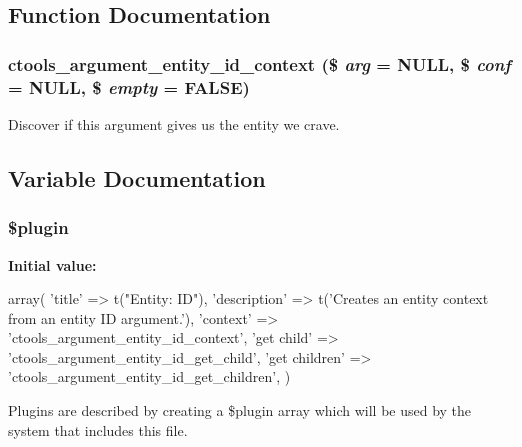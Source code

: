 \subsection{Function Documentation}
\hypertarget{entity__id_8inc_a760a7eddc5f2841801cc8fc1662c10ff}{
\subsubsection[{ctools\_\-argument\_\-entity\_\-id\_\-context}]{\setlength{\rightskip}{0pt plus 5cm}ctools\_\-argument\_\-entity\_\-id\_\-context (\$ {\em arg} = {\ttfamily NULL}, \/  \$ {\em conf} = {\ttfamily NULL}, \/  \$ {\em empty} = {\ttfamily FALSE})}}
\label{entity__id_8inc_a760a7eddc5f2841801cc8fc1662c10ff}
Discover if this argument gives us the entity we crave. 

\subsection{Variable Documentation}
\hypertarget{entity__id_8inc_ada8a7130088351710bb02ed622d6bf65}{
\subsubsection[{\$plugin}]{\setlength{\rightskip}{0pt plus 5cm}\$plugin}}
\label{entity__id_8inc_ada8a7130088351710bb02ed622d6bf65}
{\bfseries Initial value:}
\begin{DoxyCode}
 array(
  'title' => t("Entity: ID"),
  'description' => t('Creates an entity context from an entity ID argument.'),
  'context' => 'ctools_argument_entity_id_context',
  'get child' => 'ctools_argument_entity_id_get_child',
  'get children' => 'ctools_argument_entity_id_get_children',
)
\end{DoxyCode}
Plugins are described by creating a \$plugin array which will be used by the system that includes this file. 